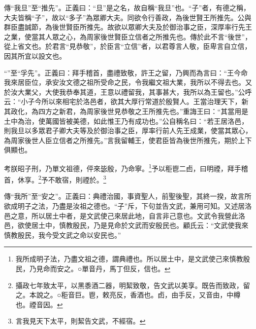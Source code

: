 {\noindent\zhuan{}\fzbyks 傳“我旦”至“推先”。正義曰：“旦”是之名，故自稱“我旦”也。“子”者，有德之稱，大夫皆稱“子”，故以“多子”為眾卿大夫。同欲令行善政，為後世賢王所推先。公與群臣盡誠節，為後世賢臣所推先。故欲以眾卿大夫及於御治事之臣，深厚率行先王之業，使當其人眾之心，為周家後世賢臣立信者之所推先也。傳於此不言“後世”，從上省文也。於君言“見恭敬”，於臣言“立信”者，以君尊言人敬，臣卑言自立信，因其所宜以設文也。 \par}

{\noindent\shu{}\fzkt “”至“孚先”。正義曰：拜手稽首，盡禮致敬，許王之留，乃興而為言曰：“王今命我來居臣位，承安汝文德之祖所受命之民，令我繼文祖大業，我所以不得去也。又於汝大業父，大使我恭奉其道，王意以禮留我，其事甚大，我所以為王留也。”公呼云：“小子今所以來相宅於洛邑者，欲其大厚行常道於殷賢人。王當治理天下，新其政化，為四方之新君，為周家後世見恭敬之王所推先也。”重誨王曰：“其當用是土中為治，使萬國皆被美德，如此惟王乃有成功也。”公自稱名曰：“若王居洛邑，則我旦以多眾君子卿大夫等及於御治事之臣，厚率行前人先王成業，使當其眾心，為周家後世人臣立信者之所推先。”言我留輔王，使君臣皆為後世所推先，期於上下俱顯也。 \par}

考朕昭子刑，乃單文祖德，伻來毖殷，乃命寧。\footnote{我所成明子法，乃盡文祖之德，謂典禮也。所以居土中，是文武使己來慎教殷民，乃見命而安之。○單音丹，馬丁但反，信也。}予以秬鬯二卣，曰明禋，拜手稽首，休享。\footnote{攝政七年致太平，以黑黍酒二器，明絜致敬，告文武以美享。既告而致政，留之。本說之。○秬音巨。鬯，敕亮反，香酒也。卣，由手反，又音由，中樽也。禋音因。}予不敢宿，則禋於。\footnote{言我見天下太平，則絜告文武，不經宿。}


{\noindent\zhuan{}\fzbyks 傳“我所”至“安之”。正義曰：典禮治國，事資聖人，前聖後聖，其終一揆，故言所欲成明子之法，乃盡是汝祖之德也。“子”斥，下句並告文武，兼用可知。又述居洛邑之意，所以居土中者，是文武使己來居此地，自言非己意也。文武令我營此洛邑，欲使居土中，慎教殷民，乃是見命於文武而安殷民也。顧氏云：“文武使我來慎教殷民，我今受文武之命以安民也。” \par}

